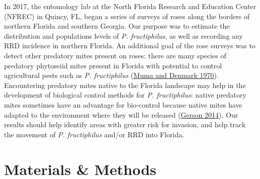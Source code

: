 \documentclass{ufdissertation}[overrideChapters] %
\begin{document}
{In 2017, the entomology lab at the North Florida Research and Education Center (NFREC) in Quincy, FL, began a series of surveys of roses along the borders of northern Florida and southern Georgia. Our purpose was to estimate the distribution and populations levels of \emph{P. fructiphilus}, as well as recording any RRD incidence in northern Florida. An additional goal of the rose surveys was to detect other predatory mites present on roses: there are many species of predatory phytoseiid mites present in Florida with potential to control agricultural pests such as \emph{P. fructiphilus} (\protect\hyperlink{ref-Muma1970}{Muma and Denmark 1970}). Encountering predatory mites native to the Florida landscape may help in the development of biological control methods for \emph{P. fructiphilus}: native predatory mites sometimes have an advantage for bio-control because native mites have adapted to the environment where they will be released (\protect\hyperlink{ref-Gerson2014}{Gerson 2014}). Our results should help identify areas with greater risk for invasion, and help track the movement of \emph{P. fructiphilus} and/or RRD into Florida.

\hypertarget{materials-methods}{%
\section{Materials \& Methods}\label{materials-methods}}

}
\end{document}
